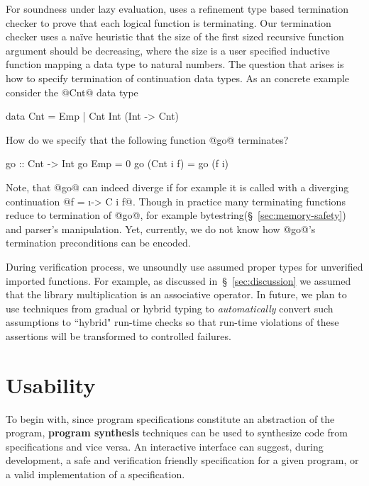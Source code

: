 For soundness under lazy evaluation, 
\toolname uses a refinement type based termination checker 
to prove that each logical function is terminating. 
%
Our termination checker uses a na\"ive heuristic 
that the size of the first sized recursive function argument should be decreasing, 
where the size is a user specified inductive function mapping a data type to natural numbers. 
%
The question that arises is how to specify termination of 
continuation data types.
%
As an concrete example consider the @Cnt@ data type
%
\begin{code}
  data Cnt = Emp | Cnt Int (Int -> Cnt)
\end{code}
How do we specify that the following function @go@ terminates?
\begin{code}
  go :: Cnt -> Int 
  go Emp = 0 
  go (Cnt i f) = go (f i)
\end{code}
Note, that @go@ can indeed diverge if for example it is called with 
a diverging continuation @f = \i -> C i f@.
% 
Though in practice many terminating functions reduce to termination of @go@, 
for example bytestring(\S~\ref{sec:memory-safety}) and parser's manipulation. 
%
Yet, currently, we do not know how @go@'s termination preconditions can be encoded. 



During verification process, we unsoundly use assumed 
proper types for unverified imported functions.
For example, as discussed in~\S~\ref{sec:discussion}
we assumed that the library multiplication is an associative operator. 
In future, we plan to use techniques from gradual or hybrid typing 
to \textit{automatically} convert such assumptions to ``hybrid" run-time checks
so that run-time violations of these assertions will be transformed to 
controlled failures.


\section{Usability}

To begin with, since program specifications constitute an abstraction 
of the program, 
\textbf{program synthesis} techniques can be used to synthesize
code from specifications and vice versa. 
%
An interactive interface can suggest, during development,  
a safe and verification friendly specification for a given program, 
or a valid implementation of a specification. 
%

